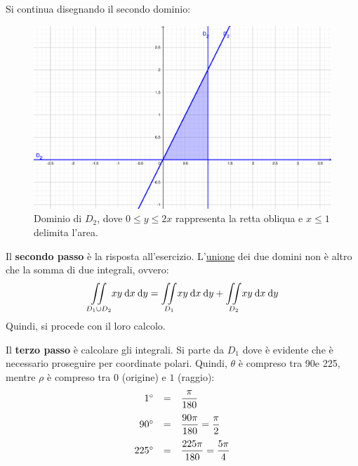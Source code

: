 \documentclass[a4paper]{article}
\begin{document}
	\noindent
	Si continua disegnando il secondo dominio:
	\begin{figure}[!htp]
		\centering
		\includegraphics[width=.6\textwidth]{img/grafico-ex6-9.pdf}
		\caption*{Dominio di $D_{2}$, dove $0 \le y \le 2x$ rappresenta la retta obliqua e $x \le 1$ delimita l'area.}
	\end{figure}

	\noindent
	Il \textbf{secondo passo} è la risposta all'esercizio. L'\underline{unione} dei due domini non è altro che la somma di due integrali, ovvero:
	\begin{equation*}
		\displaystyle\underset{D_{1} \cup D_{2}}{\int\hspace{-.5em}\int} xy \: \mathrm{d}x \: \mathrm{d}y = \underset{D_{1}}{\int\hspace{-.5em}\int} xy \: \mathrm{d}x \: \mathrm{d}y + \underset{D_{2}}{\int\hspace{-.5em}\int} xy \: \mathrm{d}x \: \mathrm{d}y
	\end{equation*}
	Quindi, si procede con il loro calcolo.\newline

	\noindent
	Il \textbf{terzo passo} è calcolare gli integrali. Si parte da $D_{1}$ dove è evidente che è necessario proseguire per coordinate polari. Quindi, $\theta$ è compreso tra 90\degree e 225\degree, mentre $\rho$ è compreso tra $0$ (origine) e $1$ (raggio):
	\begin{equation*}
		\begin{array}{rcl}
			1\degree &=& \dfrac{\pi}{180} \\ [1em]
			90\degree &=& \dfrac{90\pi}{180} = \dfrac{\pi}{2} \\ [1em]
			225\degree &=& \dfrac{225\pi}{180} = \dfrac{5\pi}{4}
		\end{array}
	\end{equation*}\newpage
\end{document}
